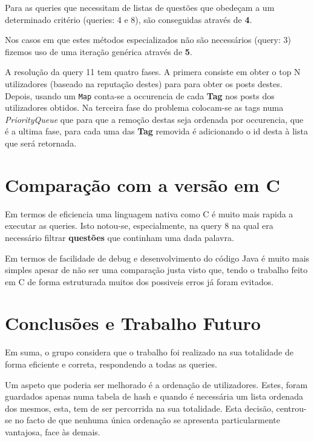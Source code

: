 \documentclass[10pt,a4paper]{report}
\begin{document}
    Para as queries que necessitam de listas de questões que obedeçam a um
    determinado critério (queries: 4 e 8), são conseguidas através de
    \textbf{4}.

    Nos casos em que estes métodos especializados não são necessários (query: 3)
    fizemos uso de uma iteração genérica através de \textbf{5}.

    A resolução da query 11 tem quatro fases. A primera consiste em obter o top
    N utilizadores (baseado na reputação destes) para para obter os posts
    destes.
    Depois, usando um \texttt{Map} conta-se a occurencia de cada
    \textbf{Tag} nos posts dos utilizadores obtidos. Na terceira fase do
    problema colocam-se as tags numa \textit{PriorityQueue} que para que a
    remoção destas seja ordenada por occurencia, que é a ultima fase, para cada
    uma das \textbf{Tag} removida é adicionando o id desta à lista que será
    retornada.

\chapter{Comparação com a versão em C}
    Em termos de eficiencia uma linguagem nativa como C é muito mais rapida a
    executar as queries. Isto notou-se, especialmente, na query 8 na qual era
    necessário filtrar \textbf{questões} que continham uma dada palavra.

    Em termos de facilidade de debug e desenvolvimento do código Java é muito
    mais simples apesar de não ser uma comparação justa visto que, tendo o
    trabalho feito em C de forma estruturada muitos dos possiveis erros já foram
    evitados.

\chapter{Conclusões e Trabalho Futuro}
    Em suma, o grupo considera que o trabalho foi realizado na sua
    totalidade de forma eficiente e correta, respondendo a todas as queries.

    Um aspeto que poderia ser melhorado é a ordenação de utilizadores. Estes,
    foram guardados apenas numa tabela de hash e quando é necessária um lista
    ordenada dos mesmos, esta, tem de ser percorrida na sua totalidade. Esta
    decisão, centrou-se no facto de que nenhuma única ordenação se apresenta
    particularmente vantajosa, face às demais.
\end{document}
